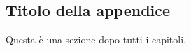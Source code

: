 \begin{appendices}
\chapter{Titolo della appendice}
Questa è una sezione dopo tutti i capitoli.
\end{appendices}
